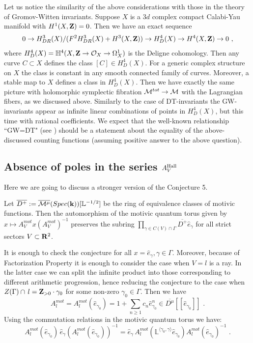 \documentclass[12pt]{article}
\begin{document}
\begin{rmk} Let us notice the similarity of the above considerations with those in the theory of Gromov-Witten invariants. Suppose $X$ is a $3d$ complex compact Calabi-Yau manifold with $H^1(X,{\bf Z})=0$. Then we have an exact sequence
$$0\to H^3_{DR}(X)/(F^2H^3_{DR}(X)+H^3(X,{\bf Z}))\to H^4_D(X)\to H^4(X,{\bf Z})\to 0\,\,,$$
where $H^4_D(X)={\mathbb H}^4(X,{\bf Z}\to {\cal O}_X\to \Omega^1_X)$ is the Deligne cohomology.
Then any curve $C\subset X$ defines the class $[C]\in H^4_D(X)$. For a generic complex structure on $X$ the class is constant in any smooth connected family of curves. Moreover, a stable map to $X$ defines a class in $H^4_D(X)$. Then we have exactly the same picture with holomorphic symplectic fibration ${\cal M}^{tot}\to {\cal M}$ with the Lagrangian fibers, as we discussed above. Similarly to the case of DT-invariants the GW-invariants appear as infinite linear combinations of points in $H^4_D(X)$, but this time with rational coefficients. We expect that the well-known relationship ``GW=DT" (see \cite{MaNOP}) should be a statement about the equality of the above-discussed counting functions (assuming positive answer to the above question).


\end{rmk}









\subsection{Absence of poles in the series $A_V^{\operatorname{Hall}}$}

Here we are going to discuss a stronger version of the Conjecture 5.

\begin{conj} Let $\overline{D^+}:=\overline{{\cal M}^{\mu}}(Spec({\bf k}))[{\mathbb L}^{-1/2}]$ be the ring of equivalence classes of motivic functions. Then the automorphism of the motivic quantum torus given by $x\mapsto A_V^{mot}x(A_V^{mot})^{-1}$ preserves the subring $\prod_{\gamma\in C(V)\cap \Gamma}\overline{D^+}\hat{e}_{\gamma}$ for all strict sectors $V\subset {\bf R}^2$.


\end{conj}


It is enough to check the conjecture for all $x=\hat{e}_{\gamma}, \gamma\in \Gamma$. Moreover, because of Factorization Property it is enough to consider the case when $V=l$ is a ray. In the latter case we can split the infinite product into those corresponding to different arithmetic progression, hence reducing the conjecture to the case when $Z(\Gamma)\cap \,l={\bf Z}_{>0}\cdot\gamma_0$ for some non-zero $\gamma_0\in \Gamma$. Then we have
$$A_l^{mot}=A_l^{mot}(\hat{e}_{\gamma_0})=1+\sum_{n\geqslant 1}c_n\hat{e}_{\gamma_0}^n\in \overline{D^{\mu}}[[\hat{e}_{\gamma_0}]]\,\,.$$
Using the commutation relations in the motivic quantum torus we have:
$$A_l^{mot}(\hat{e}_{\gamma_0})\,\hat{e}_{\gamma}(A_l^{mot}(\hat{e}_{\gamma_0}))^{-1}=
\hat{e}_{\gamma}\,A_l^{mot}({\mathbb L}^{\langle \gamma_0,\gamma\rangle} \hat{e}_{\gamma_0})A_l^{mot}(\hat{e}_{\gamma_0})^{-1}\,\,.$$
\end{document}
